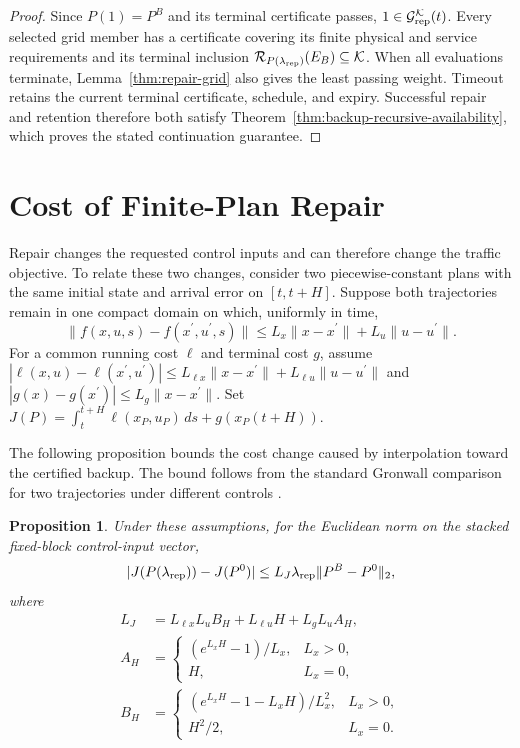 \documentclass[preprint,12pt]{elsarticle}
\theoremstyle{definition}
\theoremstyle{plain}
\newtheorem{proposition}{Proposition}
\theoremstyle{definition}
\theoremstyle{plain}
\begin{document}
\begin{proof}
Since $P(1)=P^B$ and its terminal certificate passes,
$1\in\mathcal G_{\rm rep}^{\mathcal K}(t)$. Every selected grid
member has a certificate covering its finite physical and service
requirements and its terminal inclusion
$\mathcal R_{P(\lambda_{\rm rep})}(E_B)\subseteq\mathcal K$.
When all evaluations terminate, Lemma~\ref{thm:repair-grid} also gives
the least passing weight. Timeout retains the current terminal
certificate, schedule, and expiry. Successful repair and retention
therefore both satisfy Theorem~\ref{thm:backup-recursive-availability},
which proves the stated continuation guarantee.
\end{proof}

\section{Cost of Finite-Plan Repair}
\label{sec:repair-cost-bound}
\label{app:repair-cost}

Repair changes the requested control inputs and can therefore change the
traffic objective. To relate these two changes, consider two piecewise-constant
plans with the same initial state and arrival error on $[t,t+H]$.
Suppose both trajectories remain in one compact
domain on which, uniformly in time,
\[
\|f(x,u,s)-f(x^{\prime},u^{\prime},s)\|
\le L_x\|x-x^{\prime}\|+L_u\|u-u^{\prime}\|.
\]
For a common running cost $\ell$ and terminal cost $g$, assume
$|\ell(x,u)-\ell(x^{\prime},u^{\prime})|\le L_{\ell x}\|x-x^{\prime}\|+
L_{\ell u}\|u-u^{\prime}\|$ and $|g(x)-g(x^{\prime})|\le L_g\|x-x^{\prime}\|$.
Set $J(P)=\int_t^{t+H}\ell(x_P,u_P)\,ds+g(x_P(t+H))$.

The following proposition bounds the cost change caused by interpolation
toward the certified backup. The bound follows from the standard
Gronwall comparison for two trajectories under different controls
\cite{khalil2002nonlinear}.

\begin{proposition}
\label{prop:repair-cost}
Under these assumptions, for the Euclidean norm on the stacked fixed-block
control-input vector,
\begin{equation}
|J(P(\lambda_{\rm rep}))-J(P^0)|
\le L_J\lambda_{\rm rep}\|P^B-P^0\|_2,
\label{eq:repair-cost-bound}
\end{equation}
where
\begin{align*}
L_J&=L_{\ell x}L_u B_H+L_{\ell u}H+L_gL_u A_H,\\
A_H&=\begin{cases}(e^{L_xH}-1)/L_x,&L_x>0,\\H,&L_x=0,\end{cases}\\
B_H&=\begin{cases}(e^{L_xH}-1-L_xH)/L_x^2,&L_x>0,\\H^2/2,&L_x=0.\end{cases}
\end{align*}
\end{proposition}
\end{document}
